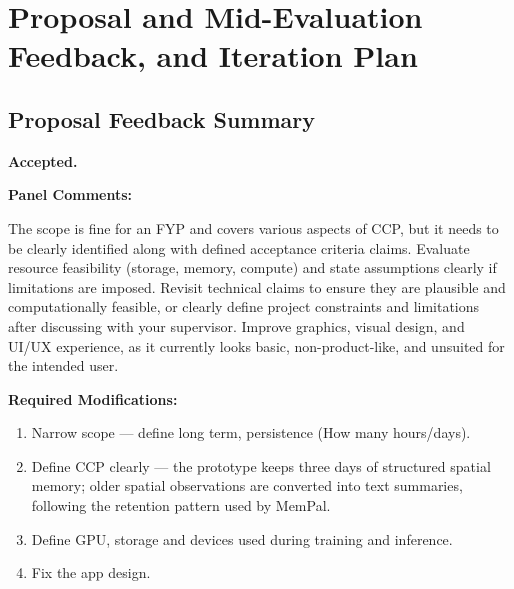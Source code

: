 \chapter{Proposal and Mid-Evaluation Feedback, and Iteration Plan}
\label{chap:plan}

\section{Proposal Feedback Summary}
\textbf{Accepted.}

\textbf{Panel Comments:}

The scope is fine for an FYP and covers various aspects of CCP, but it needs to be clearly identified along with defined acceptance criteria claims. Evaluate resource feasibility (storage, memory, compute) and state assumptions clearly if limitations are imposed. Revisit technical claims to ensure they are plausible and computationally feasible, or clearly define project constraints and limitations after discussing with your supervisor. Improve graphics, visual design, and UI/UX experience, as it currently looks basic, non-product-like, and unsuited for the intended user.

\textbf{Required Modifications:}
\begin{enumerate}
\item Narrow scope --- define long term, persistence (How many hours/days).
\item Define CCP clearly --- the prototype keeps three days of structured spatial memory; older spatial observations are converted into text summaries, following the retention pattern used by MemPal.
\item Define GPU, storage and devices used during training and inference.
\item Fix the app design.
\end{enumerate}

